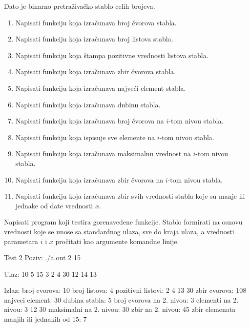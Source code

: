 \begin{Answer}[ref=709]
\end{Answer}


\begin{Exercise}[label=710]
Dato je binarno pretraživačko stablo celih brojeva.
\begin{enumerate}
\item Napisati funkciju koja izračunava broj čvorova stabla.
\item Napisati funkciju koja izračunava broj listova stabla.
\item Napisati funkciju koja štampa pozitivne vrednosti listova stabla.
\item Napisati funkciju koja izračunava zbir čvorova stabla.
\item Napisati funkciju koja izračunava najveći element stabla.
\item Napisati funkciju koja izračunava dubinu stabla.
\item Napisati funkciju koja izračunava broj čvorova na $i$-tom nivou stabla.
\item Napisati funkciju koja ispisuje sve elemente na $i$-tom nivou stabla.
\item Napisati funkciju koja izračunava maksimalnu vrednost na $i$-tom nivou stabla.
\item Napisati funkciju koja izračunava zbir čvorova na $i$-tom nivou stabla.
\item Napisati funkciju koja izračunava zbir svih vrednosti stabla koje su manje ili jednake od date vrednosti $x$.
\end{enumerate}

Napisati program koji testira gorenavedene funkcije. Stablo formirati na osnovu vrednosti koje se unose
sa standardnog ulaza, sve do kraja ulaza, a vrednosti parametara $i$ i $x$ pročitati kao argumente komandne linije. 


\begin{maxitest}
\begin{test}{Test 2}
Poziv: ./a.out 2 15

Ulaz: 
10 5 15 3 2 4 30 12 14 13

Izlaz: 
broj cvorova: 10
broj listova: 4
pozitivni listovi: 2 4 13 30
zbir cvorova: 108
najveci element: 30
dubina stabla: 5
broj cvorova na 2. nivou: 3
elementi na 2. nivou: 3 12 30
maksimalni na 2. nivou: 30
zbir na 2. nivou: 45
zbir elemenata manjih ili jednakih od 15: 7
\end{test}
\end{maxitest}

\end{Exercise}

